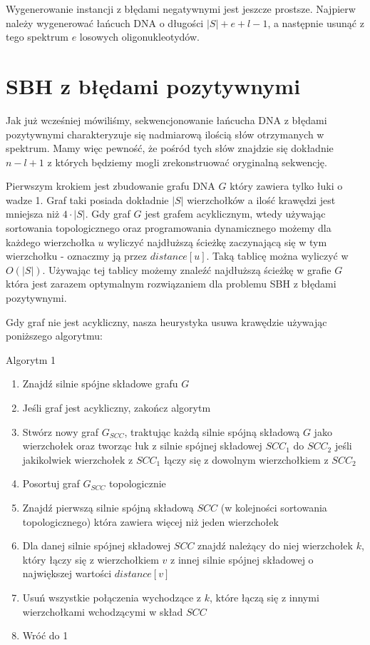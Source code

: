 \documentclass[a4paper,10pt]{article}
\begin{document}
Wygenerowanie instancji z błędami negatywnymi jest jeszcze prostsze. Najpierw należy
wygenerować łańcuch DNA o długości $|S|+e+l-1$, a następnie usunąć z tego spektrum
$e$ losowych oligonukleotydów.

\section{SBH z błędami pozytywnymi}
Jak już wcześniej mówiliśmy, sekwencjonowanie łańcucha DNA z błędami pozytywnymi charakteryzuje się
nadmiarową ilością słów otrzymanych w spektrum. Mamy więc pewność, że pośród tych słów znajdzie się dokładnie $n-l+1$ z których będziemy mogli zrekonstruować oryginalną sekwencję.

Pierwszym krokiem jest zbudowanie grafu DNA $G$ który zawiera tylko łuki o wadze 1. Graf taki posiada dokładnie $|S|$ wierzchołków a ilość krawędzi jest mniejsza niż $4 \cdot |S|$.
Gdy graf $G$ jest grafem acyklicznym, wtedy używając sortowania topologicznego oraz programowania dynamicznego możemy dla każdego wierzchołka $u$ wyliczyć 
najdłuższą ścieżkę zaczynającą się w tym wierzchołku - oznaczmy ją przez $distance[u]$. Taką tablicę można wyliczyć w $O(|S|)$. Używając tej tablicy 
możemy znaleźć najdłuższą ścieżkę w grafie $G$ która jest zarazem optymalnym rozwiązaniem dla problemu SBH z błędami pozytywnymi.

Gdy graf nie jest acykliczny, nasza heurystyka usuwa krawędzie używając poniższego algorytmu:

Algorytm 1
\begin{enumerate}
 \item Znajdź silnie spójne składowe grafu $G$
 \item Jeśli graf jest acykliczny, zakończ algorytm
 \item Stwórz nowy graf $G_{SCC}$, traktując każdą silnie spójną składową $G$ jako wierzchołek oraz
       tworząc łuk z silnie spójnej składowej $SCC_1$ do $SCC_2$ jeśli jakikolwiek wierzchołek z $SCC_1$ łączy się z dowolnym wierzchołkiem z $SCC_2$
 \item Posortuj graf $G_{SCC}$ topologicznie
 \item Znajdź pierwszą silnie spójną składową $SCC$ (w kolejności sortowania topologicznego) która zawiera więcej niż jeden wierzchołek
 \item Dla danej silnie spójnej składowej $SCC$ znajdź należący do niej wierzchołek $k$, który łączy się z wierzchołkiem $v$ z 
       innej silnie spójnej składowej o największej wartości $distance[v]$
 \item Usuń wszystkie połączenia wychodzące z $k$, które łączą się z innymi wierzchołkami wchodzącymi w skład $SCC$
 \item Wróć do 1
\end{enumerate}
\end{document}
